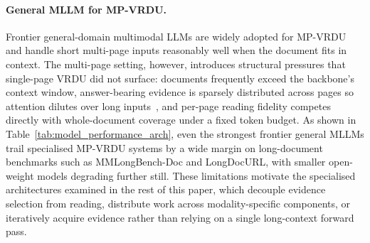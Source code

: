 \documentclass[11pt]{article}
\begin{document}
\paragraph{General MLLM for MP-VRDU.} Frontier general-domain multimodal LLMs are widely adopted for MP-VRDU and handle short multi-page inputs reasonably well when the document fits in context. The multi-page setting, however, introduces structural pressures that single-page VRDU did not surface: documents frequently exceed the backbone's context window, answer-bearing evidence is sparsely distributed across pages so attention dilutes over long inputs~\cite{liu2024lost}, and per-page reading fidelity competes directly with whole-document coverage under a fixed token budget. As shown in Table~\ref{tab:model_performance_arch}, even the strongest frontier general MLLMs trail specialised MP-VRDU systems by a wide margin on long-document benchmarks such as MMLongBench-Doc and LongDocURL, with smaller open-weight models degrading further still. These limitations motivate the specialised architectures examined in the rest of this paper, which decouple evidence selection from reading, distribute work across modality-specific components, or iteratively acquire evidence rather than relying on a single long-context forward pass.
\end{document}
